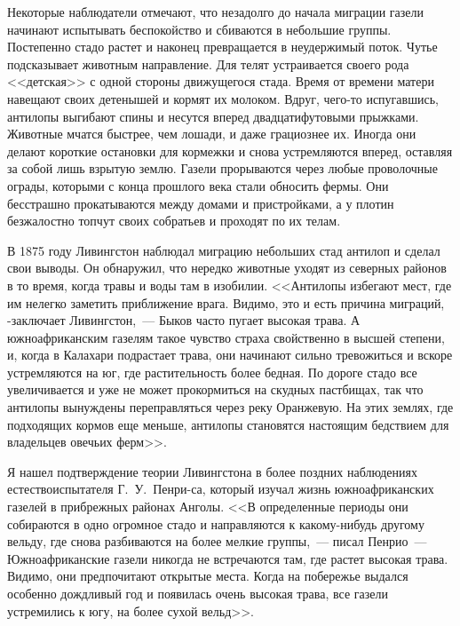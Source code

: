 \documentclass[12pt,a4paper,twoside,openany,svgnames]{memoir}
\begin{document}
Некоторые наблюдатели отмечают, что незадолго до начала миграции газели начинают испытывать беспокойство и сбиваются в небольшие группы. Постепенно стадо растет и наконец превращается в неудержимый поток. Чутье подсказывает животным направление. Для телят устраивается своего рода <<детская>> с одной стороны движущегося стада. Время от времени матери навещают своих детенышей и кормят их молоком. Вдруг, чего-то испугавшись, антилопы выгибают спины и несутся вперед двадцатифутовыми прыжками. Животные мчатся быстрее, чем лошади, и даже грациознее их. Иногда они делают короткие остановки для кормежки и снова устремляются вперед, оставляя за собой лишь взрытую землю. Газели прорываются через любые проволочные ограды, которыми с конца прошлого века стали обносить фермы. Они бесстрашно прокатываются между домами и пристройками, а у плотин безжалостно топчут своих собратьев и проходят по их телам.

В 1875 году Ливингстон наблюдал миграцию небольших стад антилоп и сделал свои выводы. Он обнаружил, что нередко животные уходят из северных районов в то время, когда травы и воды там в изобилии. <<Антилопы избегают мест, где им нелегко заметить приближение врага. Видимо, это и есть причина миграций, -заключает Ливингстон,~--- Быков часто пугает высокая трава. А южноафриканским газелям такое чувство страха свойственно в высшей степени, и, когда в Калахари подрастает трава, они начинают сильно тревожиться и вскоре устремляются на юг, где растительность более бедная. По дороге стадо все увеличивается и уже не может прокормиться на скудных пастбищах, так что антилопы вынуждены переправляться через реку Оранжевую. На этих землях, где подходящих кормов еще меньше, антилопы становятся настоящим бедствием для владельцев овечьих ферм>>.

Я нашел подтверждение теории Ливингстона в более поздних наблюдениях естествоиспытателя Г.~У.~Пенри-са, который изучал жизнь южноафриканских газелей в прибрежных районах Анголы. <<В определенные периоды они собираются в одно огромное стадо и направляются к какому-нибудь другому вельду, где снова разбиваются на более мелкие группы,~--- писал Пенрио~--- Южноафриканские газели никогда не встречаются там, где растет высокая трава. Видимо, они предпочитают открытые места. Когда на побережье выдался особенно дождливый год и появилась очень высокая трава, все газели устремились к югу, на более сухой вельд>>.
\end{document}

